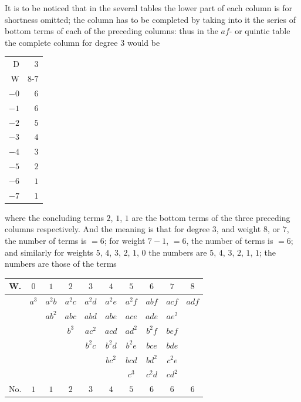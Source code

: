 \documentclass[11pt,a4paper]{book}
\begin{document}
It is to be noticed that in the several tables the lower part of each column is for shortness omitted; the column has to be completed by taking into it the series of bottom terms of each of the preceding columns: thus in the $af$- or quintic table the complete column for degree $3$ would be

\begin{center}
\begin{tabular}{r|r}
D & 3 \\
W & $8$-$7$ \\ \hline
$-0$ & $6$ \\
$-1$ & $6$ \\
$-2$ & $5$ \\
$-3$ & $4$ \\
$-4$ & $3$ \\
$-5$ & $2$ \\
$-6$ & $1$ \\
$-7$ & $1$ \\
\end{tabular}
\end{center}

where the concluding terms $2$, $1$, $1$ are the bottom terms of the three preceding columns respectively. And the meaning is that for degree $3$, and weight $8$, or $7$, the number of terms is $=6$; for weight $7-1$, $=6$, the number of terms is $=6$; and similarly for weights $5$, $4$, $3$, $2$, $1$, $0$ the numbers are $5$, $4$, $3$, $2$, $1$, $1$; the numbers are those of the terms

\begin{center}
\begin{tabular}{c|ccccccccc}
W. & $0$ & $1$ & $2$ & $3$ & $4$ & $5$ & $6$ & $7$ & $8$ \\ \hline
& $a^{3}$ & $a^{2}b$ & $a^{2}c$ & $a^{2}d$ & $a^{2}e$ & $a^{2}f$ & $abf$ & $acf$ & $adf$ \\
& & $ab^{2}$ & $abc$ & $abd$ & $abe$ & $ace$ & $ade$ & $ae^{2}$ & \\
& & & $b^{3}$ & $ac^{2}$ & $acd$ & $ad^{2}$ & $b^{2}f$ & $bef$ & \\
& & & & $b^{2}c$ & $b^{2}d$ & $b^{2}e$ & $bce$ & $bde$ & \\
& & & & & $bc^{2}$ & $bcd$ & $bd^{2}$ & $c^{2}e$ & \\
& & & & & & $c^{3}$ & $c^{2}d$ & $cd^{2}$ & \\
\hline
No. & $1$ & $1$ & $2$ & $3$ & $4$ & $5$ & $6$ & $6$ & $6$ \\
\end{tabular}
\end{center}
\end{document}
